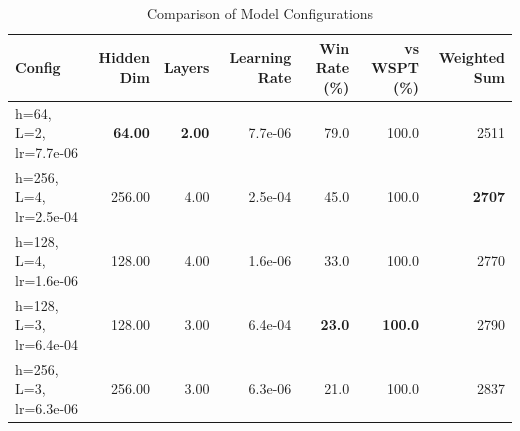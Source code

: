 \begin{table}[htbp]%
\centering%
\begin{tabular}{lrrrrrr}%
\toprule%
\textbf{Config}&\textbf{Hidden Dim}&\textbf{Layers}&\textbf{Learning Rate}&\textbf{Win Rate (\%)}&\textbf{vs WSPT (\%)}&\textbf{Weighted Sum}\\%
\midrule%
h=64, L=2, lr=7.7e-06&\textbf{64.00}&\textbf{2.00}&7.7e-06&79.0&100.0&2511\\%
h=256, L=4, lr=2.5e-04&256.00&4.00&2.5e-04&45.0&100.0&\textbf{2707}\\%
h=128, L=4, lr=1.6e-06&128.00&4.00&1.6e-06&33.0&100.0&2770\\%
h=128, L=3, lr=6.4e-04&128.00&3.00&6.4e-04&\textbf{23.0}&\textbf{100.0}&2790\\%
h=256, L=3, lr=6.3e-06&256.00&3.00&6.3e-06&21.0&100.0&2837\\%
\bottomrule%
\end{tabular}%
\caption{Comparison of Model Configurations}%
\label{tab:models}%
\end{table}